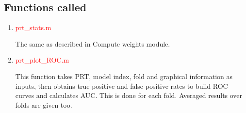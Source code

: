\subsection{Functions called}


\begin{enumerate}

\item \textcolor{red}{prt\_stats.m}

The same as described in Compute weights module. 

\item \textcolor{red}{prt\_plot\_ROC.m}

This function takes PRT, model index, fold and graphical information as inputs, then obtains true positive and false positive rates to build ROC curves and calculates AUC. This is done for each fold. Averaged results over folds are given too.  

\end{enumerate}

















